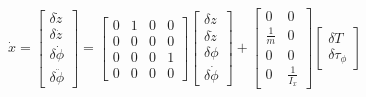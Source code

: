 \documentclass{uofa-eng-assignment}
\begin{document}
\begin{align*}
    \dot{x} = \begin{bmatrix}
        \delta \dot{z} \\
        \delta \ddot{z} \\
        \delta \dot{\phi} \\
        \delta \ddot{\phi}
    \end{bmatrix}  = \begin{bmatrix}
        0 & 1 & 0 & 0 \\
        0 & 0 & 0 & 0 \\
        0 & 0 & 0 & 1 \\
        0 & 0 & 0 & 0
    \end{bmatrix}
    \begin{bmatrix}
        \delta z \\
        \delta \dot{z} \\
        \delta \phi \\
        \delta \dot{\phi}
    \end{bmatrix} + \begin{bmatrix}
        0 & 0 \\
        \frac{1}{m} & 0 \\
        0 & 0 \\
        0 & \frac{1}{I_x}
    \end{bmatrix}
    \begin{bmatrix}
        \delta T \\
        \delta \tau_\phi
    \end{bmatrix}
\end{align*}
\end{document}
